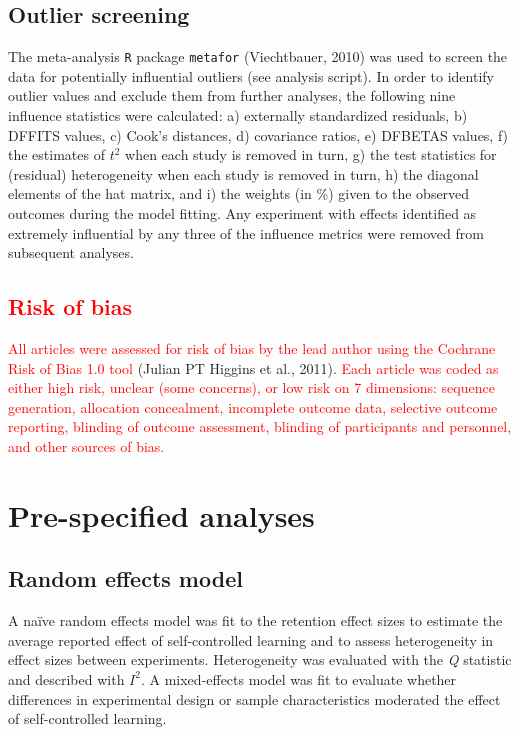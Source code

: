 \documentclass[
  english,
  man,floatsintext]{apa7}
\begin{document}
\hypertarget{outlier-screening}{%
\subsection{Outlier screening}\label{outlier-screening}}

The meta-analysis \texttt{R} package \texttt{metafor} (Viechtbauer, 2010) was used to screen the data for potentially influential outliers (see analysis script). In order to identify outlier values and exclude them from further analyses, the following nine influence statistics were calculated: a) externally standardized residuals, b) DFFITS values, c) Cook's distances, d) covariance ratios, e) DFBETAS values, f) the estimates of \(t^2\) when each study is removed in turn, g) the test statistics for (residual) heterogeneity when each study is removed in turn, h) the diagonal elements of the hat matrix, and i) the weights (in \%) given to the observed outcomes during the model fitting. Any experiment with effects identified as extremely influential by any three of the influence metrics were removed from subsequent analyses.

\hypertarget{section}{%
\subsection{\texorpdfstring{\textcolor{red}{Risk of bias}}{}}\label{section}}

\textcolor{red}{All articles were assessed for risk of bias by the lead author using the Cochrane Risk of Bias 1.0 tool} (Julian PT Higgins et al., 2011). \textcolor{red}{Each article was coded as either high risk, unclear (some concerns), or low risk on 7 dimensions: sequence generation, allocation concealment, incomplete outcome data, selective outcome reporting, blinding of outcome assessment, blinding of participants and personnel, and other sources of bias.}

\hypertarget{pre-specified-analyses}{%
\section{Pre-specified analyses}\label{pre-specified-analyses}}

\hypertarget{random-effects-model}{%
\subsection{Random effects model}\label{random-effects-model}}

A naïve random effects model was fit to the retention effect sizes to estimate the average reported effect of self-controlled learning and to assess heterogeneity in effect sizes between experiments. Heterogeneity was evaluated with the \emph{Q} statistic and described with \(I^2\). A mixed-effects model was fit to evaluate whether differences in experimental design or sample characteristics moderated the effect of self-controlled learning.
\end{document}
